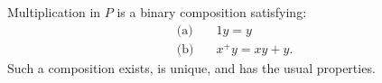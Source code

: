 Multiplication in $P$ is a binary composition satisfying:
\begin{align}
\text{(a)} &\quad 1y = y \\
\text{(b)} &\quad x^+y = xy + y.
\end{align}
Such a composition exists, is unique, and has the usual properties.

